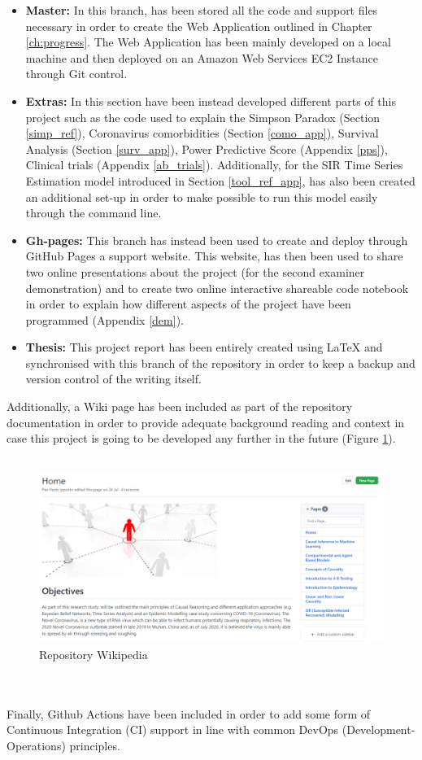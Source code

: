 \begin{appendices}
\begin{itemize}
    \item \textbf{Master:} In this branch, has been stored all the code and support files necessary in order to create the Web Application outlined in Chapter \ref{ch:progress}. The Web Application has been mainly developed on a local machine and then deployed on an Amazon Web Services EC2 Instance through Git control.  
    \item \textbf{Extras:} In this section have been instead developed different parts of this project such as the code used to explain the Simpson Paradox (Section \ref{simp_ref}), Coronavirus comorbidities (Section \ref{como_app}), Survival Analysis (Section \ref{surv_app}), Power Predictive Score (Appendix \ref{pps}),  Clinical trials (Appendix \ref{ab_trials}). Additionally, for the SIR Time Series Estimation model introduced in Section \ref{tool_ref_app}, has also been created an additional set-up in order to make possible to run this model easily through the command line.
    \item \textbf{Gh-pages:} This branch has instead been used to create and deploy through GitHub Pages a support website. This website, has then been used to share two online presentations about the project (for the second examiner demonstration) and to create two online interactive shareable code notebook in order to explain how different aspects of the project have been programmed (Appendix \ref{dem}).  
    \item \textbf{Thesis:} This project report has been entirely created using \LaTeX\:    and synchronised with this branch of the repository in order to keep a backup and version control of the writing itself.
\end{itemize}

Additionally, a Wiki page has been included as part of the repository documentation in order to provide adequate background reading and context in case this project is going to be developed any further in the future (Figure \ref{wiki_ref}).
\\
\\
\begin{figure}[ht!]%
    \centering
    \includegraphics[page=1,scale=0.56]{latex/images/wiki_page.pdf}
    \caption{Repository Wikipedia}%
    \label{wiki_ref}
\end{figure}
\\
\\
Finally, Github Actions have been included in order to add some form of Continuous Integration (CI) support in line with common DevOps (Development-Operations) principles.


\end{appendices}
